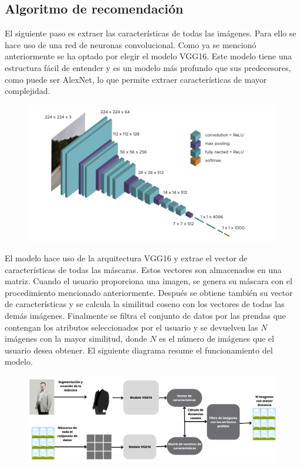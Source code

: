 \documentclass[12pt]{report} %
\begin{document}
	\subsection{Algoritmo de recomendación}
	El siguiente paso es extraer las características de todas las imágenes. Para ello se hace uso de
	una red de neuronas convolucional. Como ya se mencionó anteriormente se ha optado por 
	elegir el modelo VGG16. Este modelo tiene una estructura fácil de entender y es un modelo más profundo
	que sus predecesores, como puede ser AlexNet, lo que permite extraer características de mayor complejidad.
	\begin{figure}[H]
		{\includegraphics[scale=0.4]{vgg16.png}}
	\end{figure}

	El modelo hace uso de la arquitectura VGG16 y extrae el vector de características de todas las máscaras.
	Estos vectores son almacenados en una matriz. Cuando el usuario proporciona una imagen, se genera su máscara con el procedimiento
	mencionado anteriormente. Después se obtiene también su vector de características y se calcula la similitud coseno
	con los vectores de todas las demás imágenes. Finalmente se filtra el conjunto de datos por las prendas
	que contengan los atributos seleccionados por el usuario y se devuelven las $N$ imágenes con la mayor similitud,
	donde $N$ es el número de imágenes que el usuario desea obtener.
	El siguiente diagrama resume el funcionamiento del modelo.

	\begin{figure}[H]
		{\includegraphics[scale=0.45]{diagrama-modelo.png}}
	\end{figure}
\end{document}
